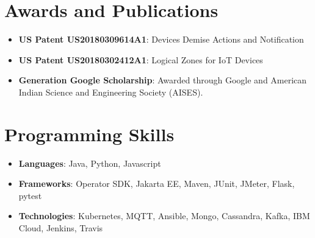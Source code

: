 \documentclass[letterpaper,11pt]{article}
\newcommand{\resumeItem}[2]{
  \item\small{
    \textbf{#1}{: #2 \vspace{-2pt}}
  }
}
\newcommand{\resumeSubItem}[2]{\resumeItem{#1}{#2}\vspace{-4pt}}
\newcommand{\resumeSubHeadingListStart}{\begin{itemize}[leftmargin=*]}
\newcommand{\resumeSubHeadingListEnd}{\end{itemize}}
\begin{document}
\section{Awards and Publications}
  \resumeSubHeadingListStart
    \resumeSubItem{US Patent US20180309614A1}
      {Devices Demise Actions and Notification}
    \resumeSubItem{US Patent US20180302412A1}
      {Logical Zones for IoT Devices}
    \resumeSubItem{Generation Google Scholarship}
      {Awarded through Google and American Indian Science and Engineering Society (AISES).}
  \resumeSubHeadingListEnd

\section{Programming Skills}
  \resumeSubHeadingListStart
    \item{
      \textbf{Languages}{: Java, Python, Javascript}
    }
    \item{
      \textbf{Frameworks}{: Operator SDK, Jakarta EE, Maven, JUnit, JMeter, Flask, pytest}
    }
    \item{
      \textbf{Technologies}{: Kubernetes, MQTT, Ansible, Mongo, Cassandra, Kafka, IBM Cloud, Jenkins, Travis}
    }
  \resumeSubHeadingListEnd


\end{document}

